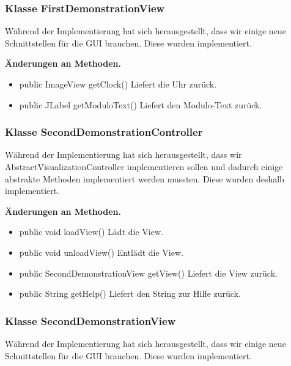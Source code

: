 \documentclass{article}
\begin{document}
    \subsubsection{Klasse FirstDemonstrationView}
	Während der Implementierung hat sich herausgestellt, dass wir einige neue Schnittstellen für die GUI brauchen. Diese wurden implementiert.\newline
           
    \textbf{Änderungen an Methoden.}
      \begin{itemize}
        \item public ImageView getClock()\newline
              Liefert die Uhr zurück.
        \item public JLabel getModuloText()\newline
              Liefert den Modulo-Text zurück.
      \end{itemize}

    \subsubsection{Klasse SecondDemonstrationController}
	Während der Implementierung hat sich herausgestellt, dass wir AbstractVisualizationController implementieren sollen und dadurch 
	einige abstrakte Methoden implementiert werden mussten. Diese wurden deshalb implementiert.\newline
           
    \textbf{Änderungen an Methoden.}
      \begin{itemize}
		\item public void loadView()\newline
              Lädt die View.
        \item public void unloadView()\newline
              Entlädt die View.
        \item public SecondDemonstrationView getView()\newline
              Liefert die View zurück.
        \item public String getHelp()\newline
              Liefert den String zur Hilfe zurück.
      \end{itemize}

    \subsubsection{Klasse SecondDemonstrationView}
	Während der Implementierung hat sich herausgestellt, dass wir einige neue Schnittstellen für die GUI brauchen. Diese wurden implementiert.\newline
           
\end{document}
